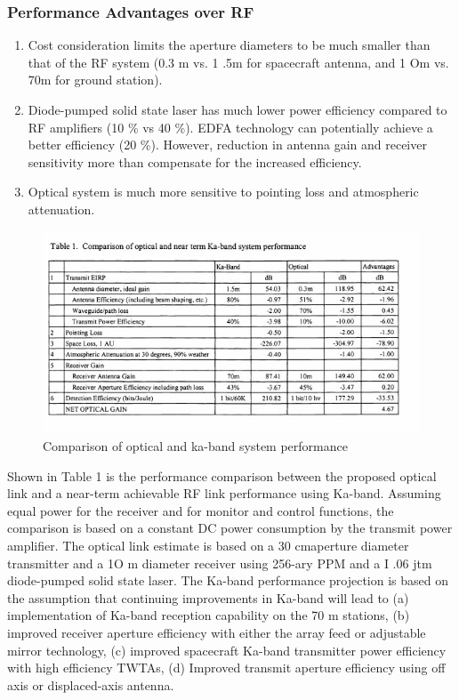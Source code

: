 \subsubsection{Performance Advantages over RF}

\begin{enumerate}
	\item Cost consideration limits the aperture diameters to be much smaller than that of the RF system (0.3 m vs. 1 .5m for spacecraft antenna, and 1 Om vs. 70m for ground station). 
	\item Diode-pumped solid state laser has much lower power efficiency compared to RF amplifiers (10 \% vs 40 \%). EDFA technology can potentially achieve a better efficiency (20 \%). However, reduction in antenna gain and receiver sensitivity more than compensate for the increased efficiency. 
	\item Optical system is much more sensitive to pointing loss and atmospheric attenuation.
\end{enumerate}

\begin{figure}[htb]
\begin{center}
\includegraphics[width=1\columnwidth]{figures/laser-communication/bh3.jpg}
\caption{Comparison of optical and ka-band system performance}
\end{center}
\end{figure}
\noindent
Shown in Table 1 is the performance comparison between the proposed optical link and a near-term achievable RF link performance using Ka-band. Assuming equal power for the receiver and for monitor and control functions, the comparison is based on a constant DC power consumption by the transmit power amplifier. The optical link estimate is based on a 30 cmaperture diameter transmitter and a 1O m diameter receiver using 256-ary PPM and a I .06 jtm diode-pumped solid state laser. The Ka-band performance projection is based on the assumption that continuing improvements in Ka-band will lead to 
(a) implementation of Ka-band reception capability on the 70 m stations,
 (b) improved receiver aperture efficiency with either
the array feed or adjustable mirror technology, 
(c) improved spacecraft Ka-band transmitter power efficiency with high efficiency TWTAs, 
(d) Improved transmit aperture efficiency using off axis or displaced-axis antenna.

